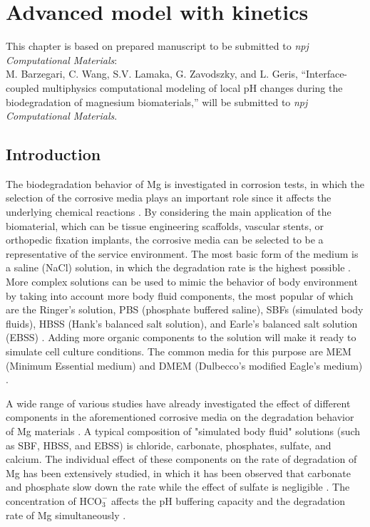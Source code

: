\chapter{Advanced model with kinetics}\label{ch:kinetics}


\begin{shaded}
This chapter is based on prepared manuscript to be submitted to  \textit{npj Computational Materials}:\\
M. Barzegari, C. Wang, S.V. Lamaka, G. Zavodszky, and L. Geris, ``Interface-coupled multiphysics computational modeling of local pH changes during the biodegradation of magnesium biomaterials,'' will be submitted to \textit{npj Computational Materials}.
\end{shaded}

\section{Introduction}

The biodegradation behavior of Mg is investigated in corrosion tests, in which the selection of the corrosive media plays an important role since it affects the underlying chemical reactions \cite{Mei2020}. By considering the main application of the biomaterial, which can be tissue engineering scaffolds, vascular stents, or orthopedic fixation implants, the corrosive media can be selected to be a representative of the service environment. The most basic form of the medium is a saline (NaCl) solution, in which the degradation rate is the highest possible \cite{Mei2020}. More complex solutions can be used to mimic the behavior of body environment by taking into account more body fluid components, the most popular of which are the Ringer's solution, PBS (phosphate buffered saline), SBFs (simulated body fluids), HBSS (Hank's balanced salt solution), and Earle's balanced salt solution (EBSS) \cite{Mei2020}. Adding more organic components to the solution will make it ready to simulate cell culture conditions. The common media for this purpose are MEM (Minimum Essential medium) and DMEM (Dulbecco's modified Eagle's medium) \cite{Mei2020}. 

A wide range of various studies have already investigated the effect of different components in the aforementioned corrosive media on the degradation behavior of Mg materials \cite{Mei2019,Zeng2014,Johnston2017, Lamaka2018,Mei2019a}. A typical composition of "simulated body fluid" solutions (such as SBF, HBSS, and EBSS) is chloride, carbonate, phosphates, sulfate, and calcium. The individual effect of these components on the rate of degradation of Mg has been extensively studied, in which it has been observed that carbonate and phosphate slow down the rate while the effect of sulfate is negligible \cite{Johnston2017,Mei2019a}. The concentration of $\mathrm{HCO}_{3}^{-}$ affects the pH buffering capacity and the degradation rate of Mg simultaneously \cite{Xin2011}.

